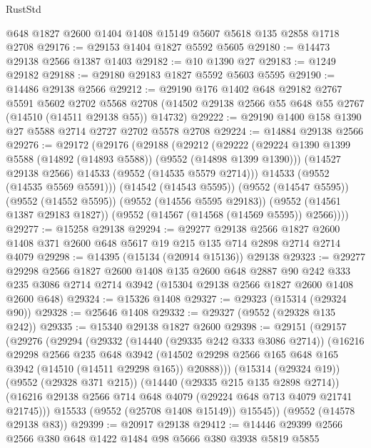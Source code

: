 \begin{lexlean}{RustStd}
\begin{coremodule}
    @648
    @1827
    @2600
    @1404
    @1408
    @15149
    @5607
    @5618
    @135
    @2858
    @1718
    @2708
@29176 := @29153 @1404 @1827 @5592 @5605
@29180 := @14473 @29138 @2566 @1387 @1403
@29182 := @10 @1390 @27
@29183 := @1249 @29182
@29188 := @29180 @29183 @1827 @5592 @5603 @5595
@29190 := @14486 @29138 @2566
@29212 := @29190
    @176
    @1402
    @648
    @29182
    @2767
    @5591
    @5602
    @2702
    @5568
    @2708
    (@14502 @29138 @2566 @55 @648 @55 @2767 (@14510 (@14511 @29138 @55)) @14732)
@29222 := @29190 @1400 @158 @1390 @27 @5588 @2714 @2727 @2702 @5578 @2708
@29224 := @14884 @29138 @2566
@29276 := @29172
    (@29176
      (@29188
        (@29212
          (@29222
            (@29224 @1390 @1399 @5588 (@14892 (@14893 @5588)) (@9552 (@14898 @1399 @1390)))
            (@14527 @29138 @2566)
            @14533
            (@9552 (@14535 @5579 @2714)))
          @14533
          (@9552 (@14535 @5569 @5591)))
        (@14542 (@14543 @5595))
        (@9552 (@14547 @5595))
        (@9552 (@14552 @5595))
        (@9552 (@14556 @5595 @29183))
        (@9552 (@14561 @1387 @29183 @1827))
        (@9552 (@14567 (@14568 (@14569 @5595)) @2566))))
@29277 := @15258 @29138
@29294 := @29277
    @29138
    @2566
    @1827
    @2600
    @1408
    @371
    @2600
    @648
    @5617
    @19
    @215
    @135
    @714
    @2898
    @2714
    @2714
    @4079
@29298 := @14395 (@15134 (@20914 @15136)) @29138
@29323 := @29277
    @29298
    @2566
    @1827
    @2600
    @1408
    @135
    @2600
    @648
    @2887
    @90
    @242
    @333
    @235
    @3086
    @2714
    @2714
    @3942
    (@15304 @29138 @2566 @1827 @2600 @1408 @2600 @648)
@29324 := @15326 @1408
@29327 := @29323 (@15314 (@29324 @90))
@29328 := @25646 @1408
@29332 := @29327 (@9552 (@29328 @135 @242))
@29335 := @15340 @29138 @1827 @2600
@29398 := @29151
    (@29157
      (@29276
        (@29294
          (@29332
            (@14440 (@29335 @242 @333 @3086 @2714))
            (@16216
              @29298
              @2566
              @235
              @648
              @3942
              (@14502 @29298 @2566 @165 @648 @165 @3942 (@14510 (@14511 @29298 @165)) @20888)))
          (@15314 (@29324 @19))
          (@9552 (@29328 @371 @215))
          (@14440 (@29335 @215 @135 @2898 @2714))
          (@16216 @29138 @2566 @714 @648 @4079 (@29224 @648 @713 @4079 @21741 @21745)))
        @15533
        (@9552 (@25708 @1408 @15149))
        @15545))
    (@9552 (@14578 @29138 @83))
@29399 := @20917 @29138
@29412 := @14446 @29399 @2566 @2566 @380 @648 @1422 @1484 @98 @5666 @380 @3938 @5819 @5855

\end{coremodule}
\end{lexlean}
